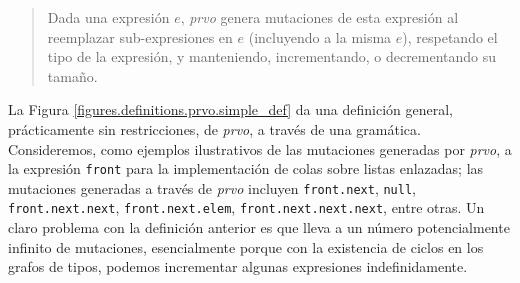 \begin{quote}
	Dada una expresi\'on $e$, \emph{prvo} genera mutaciones de esta expresi\'on al reemplazar sub-expresiones en $e$ (incluyendo a la misma $e$), respetando el tipo de la expresi\'on, y manteniendo, incrementando, o decrementando su tama\~no.
\end{quote}
La Figura \ref{figures.definitions.prvo.simple_def} da una definici\'on general, pr\'acticamente sin restricciones, de \emph{prvo}, a trav\'es de una gram\'atica. Consideremos, como ejemplos ilustrativos de las mutaciones generadas por \emph{prvo}, a la expresi\'on \texttt{front} para la implementaci\'on de colas sobre listas enlazadas; las mutaciones generadas a trav\'es de \emph{prvo} incluyen \texttt{front.next}, \texttt{null}, \texttt{front.next.next}, \texttt{front.next.elem}, \texttt{front.next.next.next}, entre otras. Un claro problema con la definici\'on anterior es que lleva a un n\'umero potencialmente infinito de mutaciones, esencialmente porque con la existencia de ciclos en los grafos de tipos, podemos incrementar algunas expresiones indefinidamente. 

